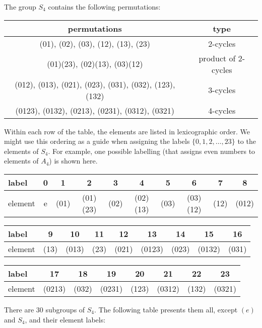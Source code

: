 
The group $S_4$ contains the following permutations:
\begin{center}
\begin{tabular}{|c|c|}
\hline
permutations & type\\[4pt]
\hline
(01), (02), (03), (12), (13), (23) & 2-cycles \\[4pt]
(01)(23), (02)(13), (03)(12) & product of 2-cycles \\[4pt]
(012), (013), (021), (023), (031), (032), (123), (132) &  3-cycles \\[4pt]
(0123), (0132), (0213), (0231), (0312), (0321) & 4-cycles \\[4pt]
\hline
\end{tabular}
\end{center}

Within each row of the table, the elements are listed in lexicographic order.  We might
use this ordering as a guide when assigning the labels $\{0, 1, 2, \ldots, 23\}$ to
the elements of $S_4$.  For example, one possible labelling 
(that assigns even numbers to elements of $A_4$) is shown here.
\\

{\scriptsize
\begin{tabular}{|l|c|c|c|c|c|c|c|c|c|}
\hline
label& 0&1& 2& 3& 4& 5& 6& 7& 8\\
\hline
element&
 e &
(01)&
(01)(23)&
(02)&
(02)(13)&
(03)&
(03)(12)&
(12)&
(012)\\
\hline
\end{tabular}
}

{\scriptsize
\begin{tabular}{|l|c|c|c|c|c|c|c|c|}
\hline
label & 9& 10& 11& 12& 13& 14& 15& 16\\
\hline
element &(13)&(013)& (23)&(021)&(0123)&(023)&(0132)&(031)\\
\hline
\end{tabular}
}

{\scriptsize
\begin{tabular}{|l|c|c|c|c|c|c|c|}
\hline
label& 17& 18& 19& 20& 21& 22& 23\\
\hline
element &(0213)&(032)&(0231)&(123)&(0312)&(132)&(0321)\\
\hline
\end{tabular}
}

\medskip

There are 30 subgroups of $S_4$. The following table presents
them all, except $(e)$ and $S_4$, and their element labels:

